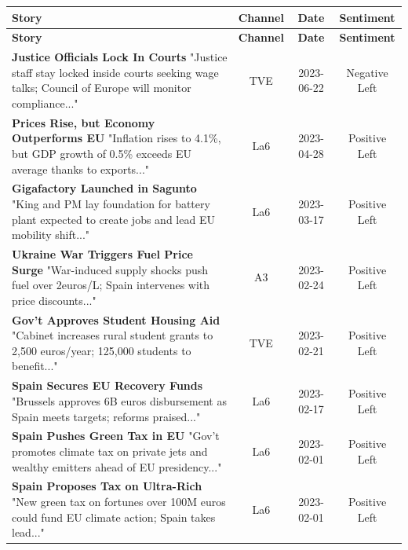 \documentclass[12pt]{article}
\begin{document}
	
	
	

\begin{longtable}{|p{8cm}|c|c|c|}
	\hline
	\textbf{Story} & \textbf{Channel} & \textbf{Date} & \textbf{Sentiment} \\
	\hline
	\endfirsthead
	\hline
	\textbf{Story} & \textbf{Channel} & \textbf{Date} & \textbf{Sentiment} \\
	\hline
	\endhead
	
	\textbf{Justice Officials Lock In Courts} \newline
	"Justice staff stay locked inside courts seeking wage talks; Council of Europe will monitor compliance..." & TVE & 2023-06-22 & Negative Left \\
	\hline
	\textbf{Prices Rise, but Economy Outperforms EU} \newline
	"Inflation rises to 4.1\%, but GDP growth of 0.5\% exceeds EU average thanks to exports..." & La6 & 2023-04-28 & Positive Left \\
	\hline
	\textbf{Gigafactory Launched in Sagunto} \newline
	"King and PM lay foundation for battery plant expected to create jobs and lead EU mobility shift..." & La6 & 2023-03-17 & Positive Left \\
	\hline
	\textbf{Ukraine War Triggers Fuel Price Surge} \newline
	"War-induced supply shocks push fuel over 2euros/L; Spain intervenes with price discounts..." & A3 & 2023-02-24 & Positive Left \\
	\hline
	\textbf{Gov’t Approves Student Housing Aid} \newline
	"Cabinet increases rural student grants to 2,500 euros/year; 125,000 students to benefit..." & TVE & 2023-02-21 & Positive Left \\
	\hline
	\textbf{Spain Secures EU Recovery Funds} \newline
	"Brussels approves 6B euros disbursement as Spain meets targets; reforms praised..." & La6 & 2023-02-17 & Positive Left \\
	\hline
	\textbf{Spain Pushes Green Tax in EU} \newline
	"Gov’t promotes climate tax on private jets and wealthy emitters ahead of EU presidency..." & La6 & 2023-02-01 & Positive Left \\
	\hline
	\textbf{Spain Proposes Tax on Ultra-Rich} \newline
	"New green tax on fortunes over 100M euros could fund EU climate action; Spain takes lead..." & La6 & 2023-02-01 & Positive Left \\

\end{longtable}
\end{document}
